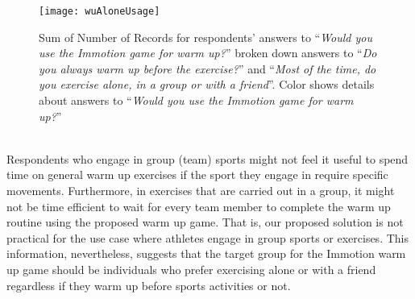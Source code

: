 \begin{figure}[h]
    \centering
    \texttt{[image: wuAloneUsage]}
    \caption [Results for the Immotion prototype related question.]{Sum of Number of Records for respondents' answers to ``\textit{Would you use the Immotion game for warm up?}'' broken down answers to ``\textit{Do you always warm up before the exercise?}'' and ``\textit{Most of the time, do you exercise alone, in a group or with a friend}''. Color shows details about answers to ``\textit{Would you use the Immotion game for warm up?}''}
    \label{fig:wuAloneUsage}
\end{figure}\\
Respondents who engage in group (team) sports might not feel it useful to spend time on general warm up exercises if the sport they engage in require specific movements. Furthermore, in exercises that are carried out in a group, it might not be time efficient to wait for every team member to complete the warm up routine using the proposed warm up game. That is, our proposed solution is not practical for the use case where athletes engage in group sports or exercises. This information, nevertheless, suggests that the target group for the Immotion warm up game should be individuals who prefer exercising alone or with a friend regardless if they warm up before sports activities or not. %
